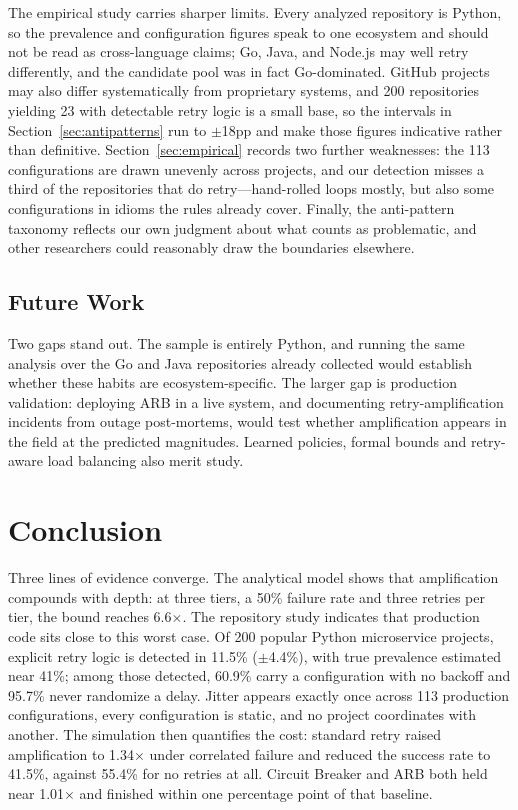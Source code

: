 \documentclass[conference]{IEEEtran}
\begin{document}
The empirical study carries sharper limits. Every analyzed repository is Python, so the prevalence and configuration figures speak to one ecosystem and should not be read as cross-language claims; Go, Java, and Node.js may well retry differently, and the candidate pool was in fact Go-dominated. GitHub projects may also differ systematically from proprietary systems, and 200 repositories yielding 23 with detectable retry logic is a small base, so the intervals in Section~\ref{sec:antipatterns} run to $\pm$18pp and make those figures indicative rather than definitive. Section~\ref{sec:empirical} records two further weaknesses: the 113 configurations are drawn unevenly across projects, and our detection misses a third of the repositories that do retry---hand-rolled loops mostly, but also some configurations in idioms the rules already cover. Finally, the anti-pattern taxonomy reflects our own judgment about what counts as problematic, and other researchers could reasonably draw the boundaries elsewhere.

\subsection{Future Work}

Two gaps stand out. The sample is entirely Python, and running the same analysis over the Go and Java repositories already collected would establish whether these habits are ecosystem-specific. The larger gap is production validation: deploying ARB in a live system, and documenting retry-amplification incidents from outage post-mortems, would test whether amplification appears in the field at the predicted magnitudes. Learned policies, formal bounds and retry-aware load balancing also merit study.

\section{Conclusion}

Three lines of evidence converge. The analytical model shows that amplification compounds with depth: at three tiers, a 50\% failure rate and three retries per tier, the bound reaches 6.6$\times$. The repository study indicates that production code sits close to this worst case. Of 200 popular Python microservice projects, explicit retry logic is detected in 11.5\% ($\pm$4.4\%), with true prevalence estimated near 41\%; among those detected, 60.9\% carry a configuration with no backoff and 95.7\% never randomize a delay. Jitter appears exactly once across 113 production configurations, every configuration is static, and no project coordinates with another. The simulation then quantifies the cost: standard retry raised amplification to 1.34$\times$ under correlated failure and reduced the success rate to 41.5\%, against 55.4\% for no retries at all. Circuit Breaker and ARB both held near 1.01$\times$ and finished within one percentage point of that baseline.
\end{document}
